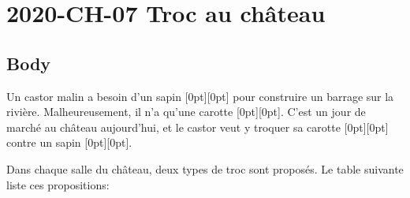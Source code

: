 \documentclass[a4paper,11pt]{report}
\newcommand{\taskGraphicsFolder}{..}
\begin{document}
\section*{\centering{} 2020-CH-07 Troc au château}


\subsection*{Body}

Un castor malin a besoin d’un sapin \raisebox{-0.5ex}[0pt][0pt]{} pour construire un barrage sur la rivière. Malheureusement, il n’a qu’une carotte \raisebox{-0.5ex}[0pt][0pt]{}. C’est un jour de marché au château aujourd’hui, et le castor veut y troquer sa carotte \raisebox{-0.5ex}[0pt][0pt]{} contre un sapin \raisebox{-0.5ex}[0pt][0pt]{}.

Dans chaque salle du château, deux types de troc sont proposés. Le table suivante liste ces propositions:
\end{document}
